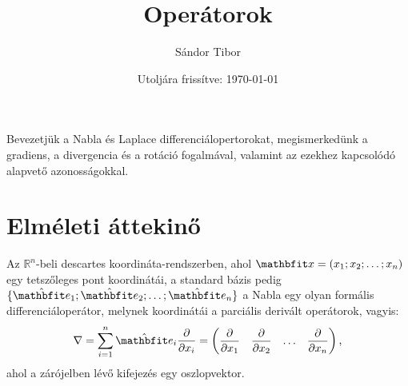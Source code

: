 \documentclass[lang=magyar]{math-handout}
\title{Operátorok}
\date{Utoljára frissítve: \today}
\author{Sándor Tibor}
\begin{document}
\allowdisplaybreaks

\maketitle

\vspace{1em}

\begin{summary}
  Bevezetjük a Nabla és Laplace differenciálopertorokat, megismerkedünk a
  gradiens, a divergencia és a rotáció fogalmával, valamint az ezekhez
  kapcsolódó alapvető azonosságokkal.
\end{summary}

\vspace{-1em}

\section{Elméleti áttekinő}

\vfill

\begin{definition}
  Az $\mathbb R^n$-beli descartes koordináta-rendszerben, ahol $\rvec x = (x_1;
    x_2; \dots; x_n)$ egy tetszőleges pont koordinátái, a standard bázis pedig
  $\{ \uvec e_1; \uvec e_2; \dots; \uvec e_n \}$ a Nabla egy olyan formális
  differenciáloperátor, melynek koordinátái a parciális derivált operátorok,
  vagyis:
  \[
    \nabla = \sum_{i = 1}^n \uvec e_i \pdv{}{x_i}
    =
    \begin{pmatrix}
      \displaystyle\pdv{}{x_1} &
      \displaystyle\pdv{}{x_2} &
      \hdots                   &
      \displaystyle\pdv{}{x_n}
    \end{pmatrix}
    \text,
  \]
  ahol a zárójelben lévő kifejezés egy oszlopvektor.
\end{definition}

\vfill
\end{document}
